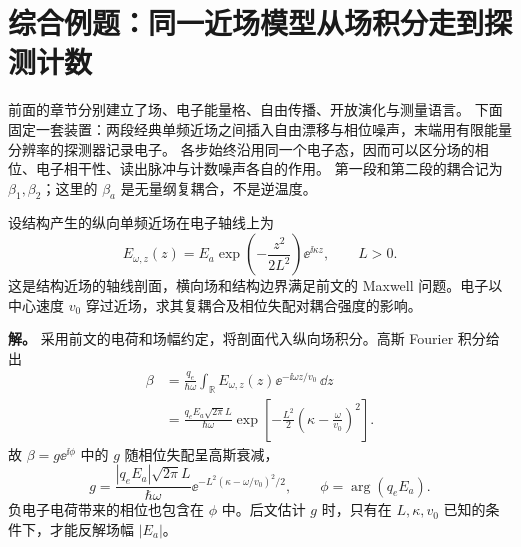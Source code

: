 \section{综合例题：同一近场模型从场积分走到探测计数}
\label{sec:feqo-nearfield-counts-comprehensive}

前面的章节分别建立了场、电子能量格、自由传播、开放演化与测量语言。
下面固定一套装置：两段经典单频近场之间插入自由漂移与相位噪声，末端用有限能量分辨率的探测器记录电子。
各步始终沿用同一个电子态，因而可以区分场的相位、电子相干性、读出脉冲与计数噪声各自的作用。
第一段和第二段的耦合记为 $\beta_1,\beta_2$；这里的 $\beta_a$ 是无量纲复耦合，不是逆温度。

\begin{exbox}
设结构产生的纵向单频近场在电子轴线上为
\[
 E_{\omega,z}(z)=E_a\exp\!\left(-\frac{z^2}{2L^2}\right)\ee^{\ii \kappa z},
 \qquad L>0.
\]
这是结构近场的轴线剖面，横向场和结构边界满足前文的 Maxwell 问题。电子以中心速度 $v_0$ 穿过近场，求其复耦合及相位失配对耦合强度的影响。

\textbf{解。} 采用前文的电荷和场幅约定，将剖面代入纵向场积分。高斯 Fourier 积分给出
\begin{align*}
 \beta&=\frac{q_e}{\hbar\omega}\int_{\mathbb R}
 E_{\omega,z}(z)\ee^{-\ii \omega z/v_0}\,\dd z\\
 &=\frac{q_e E_a\sqrt{2\pi}L}{\hbar\omega}
 \exp\!\left[-\frac{L^2}{2}\left(\kappa-\frac{\omega}{v_0}\right)^2\right].
\end{align*}
故 $\beta=g \ee^{\ii \phi}$ 中的 $g$ 随相位失配呈高斯衰减，
\[
 g=\frac{|q_e E_a|\sqrt{2\pi}L}{\hbar\omega}
 \ee^{-L^2(\kappa-\omega/v_0)^2/2},
 \qquad \phi=\arg(q_eE_a).
\]
负电子电荷带来的相位也包含在 $\phi$ 中。后文估计 $g$ 时，只有在
$L,\kappa,v_0$ 已知的条件下，才能反解场幅 $|E_a|$。
\end{exbox}

